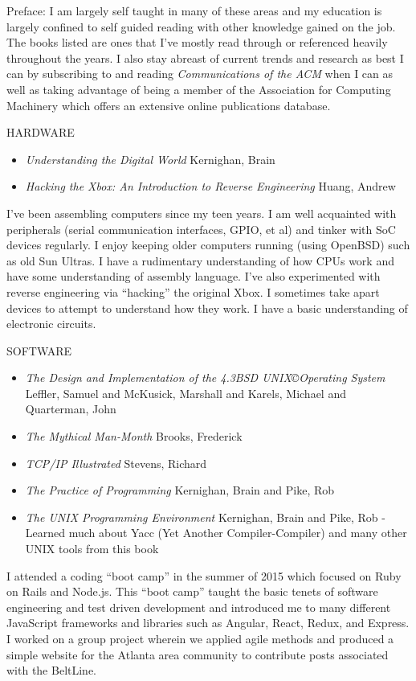 \documentclass[12pt]{report}
\begin{document}
Preface: I am largely self taught in many of these areas and my education is largely confined to self guided reading with other knowledge gained on the job. The books listed are ones that I've mostly read through or referenced heavily throughout the years. I also stay abreast of current trends and research as best I can by subscribing to and reading \emph {Communications of the ACM} when I can as well as taking advantage of being a member of the Association for Computing Machinery which offers an extensive online publications database.\hfill \break

HARDWARE
\begin{itemize}
  \item \emph {Understanding the Digital World} Kernighan, Brain
  \item \emph {Hacking the Xbox: An Introduction to Reverse Engineering} Huang, Andrew
\end{itemize}
I've been assembling computers since my teen years. I am well acquainted with peripherals (serial communication interfaces, GPIO, et al) and tinker with SoC devices regularly. I enjoy keeping older computers running (using OpenBSD) such as old Sun Ultras. I have a rudimentary understanding of how CPUs work and have some understanding of assembly language. I've also experimented with reverse engineering via ``hacking'' the original Xbox. I sometimes take apart devices to attempt to understand how they work. I have a basic understanding of electronic circuits.\hfill \break

SOFTWARE
\begin{itemize}
  \item \emph {The Design and Implementation of the 4.3BSD UNIX\copyright Operating System} Leffler, Samuel and McKusick, Marshall and Karels, Michael and Quarterman, John
  \item \emph {The Mythical Man-Month} Brooks, Frederick
  \item \emph {TCP/IP Illustrated} Stevens, Richard
  \item \emph {The Practice of Programming} Kernighan, Brain and Pike, Rob
  \item \emph {The UNIX Programming Environment} Kernighan, Brain and Pike, Rob - Learned much about Yacc (Yet Another Compiler-Compiler) and many other UNIX tools from this book
\end{itemize}
I attended a coding ``boot camp'' in the summer of 2015 which focused on Ruby on Rails and Node.js. This ``boot camp'' taught the basic tenets of software engineering and test driven development and introduced me to many different JavaScript frameworks and libraries such as Angular, React, Redux, and Express. I worked on a group project wherein we applied agile methods and produced a simple website for the Atlanta area community to contribute posts associated with the BeltLine.
\end{document}
